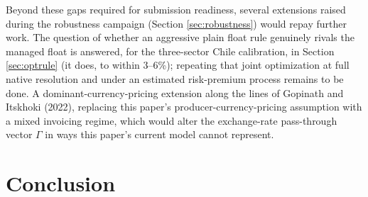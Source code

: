 \documentclass[12pt]{article}
\begin{document}
Beyond these gaps required for submission readiness, several extensions raised during the robustness
campaign (Section \ref{sec:robustness}) would repay further work. The question of whether an aggressive plain
float rule genuinely rivals the managed float is answered, for the three-sector Chile calibration, in Section
\ref{sec:optrule} (it does, to within 3--6\%); repeating that joint optimization at full native resolution and under
an estimated risk-premium process remains to be done. A dominant-currency-pricing extension along the lines of Gopinath and
Itskhoki (2022), replacing this paper's producer-currency-pricing assumption with a mixed invoicing
regime, which would alter the exchange-rate pass-through vector $\Gamma$ in ways this paper's current
model cannot represent.

\section{Conclusion}
\label{sec:conclusion}
\end{document}
